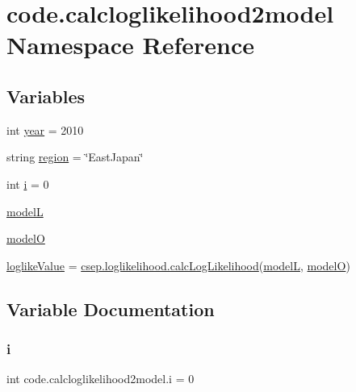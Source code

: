 \hypertarget{namespacecode_1_1calcloglikelihood2model}{}\section{code.\+calcloglikelihood2model Namespace Reference}
\label{namespacecode_1_1calcloglikelihood2model}
\subsection*{Variables}
\begin{DoxyCompactItemize}
\item 
int \hyperlink{namespacecode_1_1calcloglikelihood2model_a3918a0cd82882d542a7998c6731026a4}{year} = 2010
\item 
string \hyperlink{namespacecode_1_1calcloglikelihood2model_a17e943beb802f581617c85f011b9864f}{region} = \char`\"{}East\+Japan\char`\"{}
\item 
int \hyperlink{namespacecode_1_1calcloglikelihood2model_a1a573048714f1c94f6e93564807769d3}{i} = 0
\item 
\hyperlink{namespacecode_1_1calcloglikelihood2model_a5aaa93097dbdcb0c7e0489a15713ba4b}{modelL}
\item 
\hyperlink{namespacecode_1_1calcloglikelihood2model_a925ea1bdbcc96295bcb651978a42ee9b}{modelO}
\item 
\hyperlink{namespacecode_1_1calcloglikelihood2model_a5b4c8d5b3315c97624599ed80527ae4c}{loglike\+Value} = \hyperlink{namespacecode_1_1csep_1_1loglikelihood_a4210aa6f0234a558dc10b7d9efbce3d7}{csep.\+loglikelihood.\+calc\+Log\+Likelihood}(\hyperlink{namespacecode_1_1calcloglikelihood2model_a5aaa93097dbdcb0c7e0489a15713ba4b}{modelL}, \hyperlink{namespacecode_1_1calcloglikelihood2model_a925ea1bdbcc96295bcb651978a42ee9b}{modelO})
\end{DoxyCompactItemize}


\subsection{Variable Documentation}
\mbox{\label{namespacecode_1_1calcloglikelihood2model_a1a573048714f1c94f6e93564807769d3}} 
\subsubsection{\texorpdfstring{i}{i}}
{\footnotesize\ttfamily int code.\+calcloglikelihood2model.\+i = 0}

